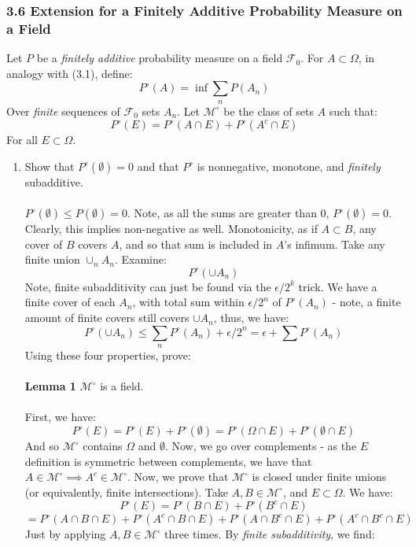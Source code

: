 \documentclass[12pt,a4paper]{article}
\newcommand{\1}[1]{\mathbbm{1}\left\{ #1 \right\}}
\newcommand{\fcal}{\mathcal{F}}
\newcommand{\mcal}{\mathcal{M}}
\begin{document}
\subsubsection{3.6 Extension for a Finitely Additive Probability Measure on a Field} Let $P$ be a \textit{finitely additive} probability measure on a field $\fcal_0$. For $A \subset \Omega$, in analogy with (3.1), define:
$$
	P^\circ(A) = \inf \sum_n P(A_n)
$$
Over \textit{finite} sequences of $\fcal_0$ sets $A_n$. Let $\mcal^\circ$ be the class of sets $A$ such that:
$$
	P^\circ(E) = P^\circ(A \cap E) + P^\circ(A^c \cap E)
$$
For all $E \subset \Omega$.

\begin{enumerate}
	\item Show that $P^\circ(\emptyset) = 0$ and that $P^\circ$ is nonnegative, monotone, and \textit{finitely} subadditive.
	\\\\
	$P^\circ(\emptyset) \leq P(\emptyset) = 0$. Note, as all the sums are greater than $0$, $P^\circ(\emptyset) = 0$. Clearly, this implies non-negative as well. Monotonicity, as if $A \subset B$, any cover of $B$ covers $A$, and so that sum is included in $A$'s infimum. Take any finite union $\cup_n A_n$. Examine:
	$$
		P^\circ(\cup A_n)
	$$
	Note, finite subadditivity can just be found via the $\epsilon/2^k$ trick. We have a finite cover of each $A_n$, with total sum within $\epsilon/2^n$ of $P^\circ(A_n)$ - note, a finite amount of finite covers still covers $\cup A_n$, thus, we have:
	$$
		P^\circ(\cup A_n) \leq \sum_n P^\circ(A_n) + \epsilon/2^n = \epsilon + \sum P^\circ(A_n)
	$$
	Using these four properties, prove:
	\\\\
	\textbf{Lemma 1} $\mcal^\circ$ is a field.
	\\\\
	First, we have:
	$$
		P^\circ(E) = P^\circ(E) + P^\circ(\emptyset) = P^\circ(\Omega \cap E) + P^\circ(\emptyset \cap E)
	$$
	And so $\mcal^\circ$ contains $\Omega$ and $\emptyset$. Now, we go over complements - as the $E$ definition is symmetric between complements, we have that $A \in \mcal^\circ \implies A^c \in \mcal^\circ$. Now, we prove that $\mcal^\circ$ is closed under finite unions (or equivalently, finite intersections). Take $A,B \in \mcal^\circ$, and $E \subset \Omega$. We have:
	$$
		P^\circ(E) = P^\circ(B \cap E) + P^\circ(B^c \cap E)
	$$
	$$
		=
		P^\circ(A \cap B \cap E) + P^\circ(A^c \cap B \cap E) + P^\circ(A \cap B^c \cap E) + P^\circ(A^c \cap B^c \cap E)
	$$
	Just by applying $A,B \in \mcal^\circ$ three times. By \textit{finite subadditivity}, we find:

\end{enumerate}
\end{document}
